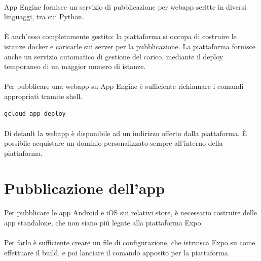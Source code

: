\documentclass[12pt,a4paper,twoside,english,italian]{book}
\begin{document}
\paragraph{} App Engine fornisce un servizio di pubblicazione per webapp scritte in diversi linguaggi, tra cui Python. 

\paragraph{} È anch'esso completamente gestito: la piattaforma si occupa di costruire le istanze docker e caricarle sui server per la pubblicazione. La piattaforma fornisce anche un servizio automatico di gestione del carico, mediante il deploy temporaneo di un maggior numero di istanze. 

\paragraph{} Per pubblicare una webapp su App Engine è sufficiente richiamare i comandi appropriati tramite shell. 

\begin{lstlisting}[caption=Pubblicazione della webapp su App Engine]
gcloud app deploy
\end{lstlisting}

\paragraph{} Di default la webapp è disponibile ad un indirizzo offerto dalla piattaforma. È possibile acquistare un dominio personalizzato sempre all'interno della piattaforma.

\newpage

\section{Pubblicazione dell'app}

\paragraph{} Per pubblicare le app Android e iOS sui relativi store, è necessario costruire delle app standalone, che non siano più legate alla piattaforma Expo. 

\paragraph{} Per farlo è sufficiente creare un file di configurazione, che istruisca Expo su come effettuare il build, e poi lanciare il comando apposito per la piattaforma. 
\end{document}
